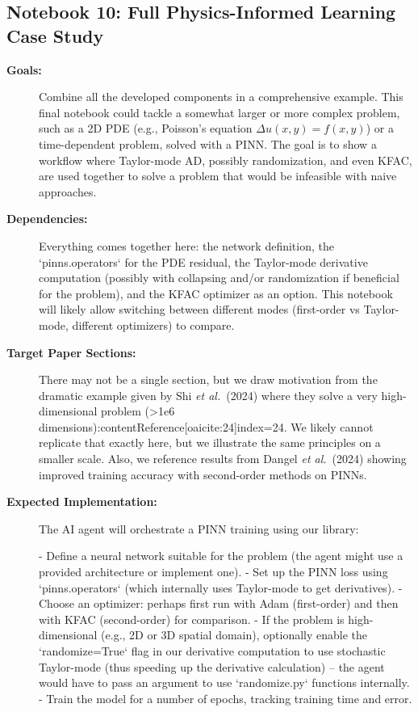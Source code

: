 \documentclass[11pt]{article}
\begin{document}
\subsection{Notebook 10: Full Physics-Informed Learning Case Study}
\begin{description}
  \item[\textbf{Goals:}] Combine all the developed components in a comprehensive example. This final notebook could tackle a somewhat larger or more complex problem, such as a 2D PDE (e.g., Poisson's equation $\Delta u(x,y) = f(x,y)$) or a time-dependent problem, solved with a PINN. The goal is to show a workflow where Taylor-mode AD, possibly randomization, and even KFAC, are used together to solve a problem that would be infeasible with naive approaches.
  \item[\textbf{Dependencies:}] Everything comes together here: the network definition, the `pinns.operators` for the PDE residual, the Taylor-mode derivative computation (possibly with collapsing and/or randomization if beneficial for the problem), and the KFAC optimizer as an option. This notebook will likely allow switching between different modes (first-order vs Taylor-mode, different optimizers) to compare.
  \item[\textbf{Target Paper Sections:}] There may not be a single section, but we draw motivation from the dramatic example given by Shi \textit{et al.}\ (2024) where they solve a very high-dimensional problem (>1e6 dimensions):contentReference[oaicite:24]{index=24}. We likely cannot replicate that exactly here, but we illustrate the same principles on a smaller scale. Also, we reference results from Dangel \textit{et al.}\ (2024) showing improved training accuracy with second-order methods on PINNs.
  \item[\textbf{Expected Implementation:}] The AI agent will orchestrate a PINN training using our library:
  
  - Define a neural network suitable for the problem (the agent might use a provided architecture or implement one).
  - Set up the PINN loss using `pinns.operators` (which internally uses Taylor-mode to get derivatives).
  - Choose an optimizer: perhaps first run with Adam (first-order) and then with KFAC (second-order) for comparison.
  - If the problem is high-dimensional (e.g., 2D or 3D spatial domain), optionally enable the `randomize=True` flag in our derivative computation to use stochastic Taylor-mode (thus speeding up the derivative calculation) – the agent would have to pass an argument to use `randomize.py` functions internally.
  - Train the model for a number of epochs, tracking training time and error.
  

\end{description}
\end{document}
